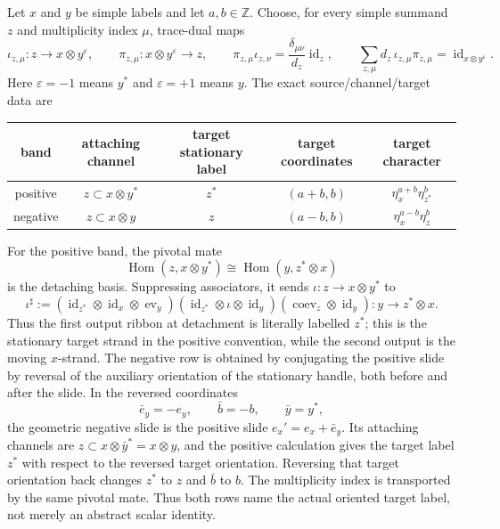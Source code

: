 \begin{lemma}
\label{lem:character-aware-fusion-attachment}
Let $x$ and $y$ be simple labels and let $a,b\in\mathbb Z$.  Choose, for
every simple summand $z$ and multiplicity index $\mu$, trace-dual maps
\[
  \iota_{z,\mu}\colon z\longrightarrow x\otimes y^{\varepsilon},
  \qquad
  \pi_{z,\mu}\colon x\otimes y^{\varepsilon}\longrightarrow z,
  \qquad
  \pi_{z,\mu}\iota_{z,\nu}
    =\frac{\delta_{\mu\nu}}{d_z}\operatorname{id}_z,
  \qquad
  \sum_{z,\mu}d_z\,\iota_{z,\mu}\pi_{z,\mu}
    =\operatorname{id}_{x\otimes y^{\varepsilon}}.
\]
Here $\varepsilon=-1$ means $y^*$ and $\varepsilon=+1$ means $y$.
The exact source/channel/target data are
\begin{center}
\begin{tabular}{c|c|c|c|c}
band & attaching channel & target stationary label & target coordinates
  & target character \\
\hline
positive & $z\subset x\otimes y^*$ & $z^*$ & $(a+b,b)$
  & $\eta_x^{a+b}\eta_{z^*}^{b}$ \\
negative & $z\subset x\otimes y$ & $z$ & $(a-b,b)$
  & $\eta_x^{a-b}\eta_z^{b}$
\end{tabular}
\end{center}
For the positive band, the pivotal mate
\[
  \operatorname{Hom}(z,x\otimes y^*)
  \cong\operatorname{Hom}(y,z^*\otimes x)
\]
is the detaching basis.  Suppressing associators, it sends
$\iota\colon z\to x\otimes y^*$ to
\[
  \iota^\sharp
  :=(\operatorname{id}_{z^*}\otimes\operatorname{id}_x
       \otimes\operatorname{ev}_y)
    (\operatorname{id}_{z^*}\otimes\iota\otimes\operatorname{id}_y)
    (\operatorname{coev}_z\otimes\operatorname{id}_y)
  \colon y\longrightarrow z^*\otimes x.
\]
Thus the first output ribbon at detachment is literally labelled $z^*$; this
is the stationary target strand in the positive convention, while the second
output is the moving $x$-strand.  The negative row is obtained by conjugating the positive slide by
reversal of the auxiliary orientation of the stationary handle, both before
and after the slide.  In the reversed coordinates
\[
  \bar e_y=-e_y,\qquad \bar b=-b,\qquad \bar y=y^*,
\]
the geometric negative slide is the positive slide
$e_x'=e_x+\bar e_y$.  Its attaching channels are
$z\subset x\otimes\bar y^*=x\otimes y$, and the positive calculation gives
the target label $z^*$ with respect to the reversed target orientation.
Reversing that target orientation back changes $z^*$ to $z$ and
$\bar b$ to $b$.  The multiplicity index is transported by the same pivotal
mate.  Thus both rows name the actual oriented target label, not merely an
abstract scalar identity.
\end{lemma}

